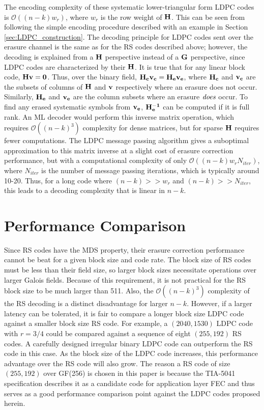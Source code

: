 \documentclass[conference]{IEEEtran}
\begin{document}
The encoding complexity of these systematic lower-triangular form LDPC codes is $\mathcal O((n-k)w_r)$, where $w_r$ is the row weight of $\bf{H}$.  This can be seen from following the simple encoding procedure described with an example in Section \ref{sec:LDPC_construction}.  The decoding principle for LDPC codes sent over the erasure channel is the same as for the RS codes described above; however, the decoding is explained from a $\bf{H}$ perspective instead of a $\bf{G}$ perspective, since LDPC codes are characterized by their $\bf{H}$.  It is true that for any linear block code, $\bf{H}\bf{v} = \bf{0}$.  Thus, over the binary field, $\bf{H}_c\bf{v}_c = \bf{H}_e\bf{v}_e$, where $\bf{H}_c$ and $\bf{v}_c$ are the subsets of columns of $\bf{H}$ and $\bf{v}$ respectively where an erasure does not occur.  Similarly, $\bf{H}_e$ and $\bf{v}_e$ are the column subsets where an erasure $\it{does}$ occur.  To find any erased systematic symbols from $\bf{v}_e$, $\bf{H}_e^{-1}$ can be computed if it is full rank.  An ML decoder would perform this inverse matrix operation, which requires $\mathcal O((n-k)^3)$ complexity for dense matrices, but for sparse $\bf{H}$ requires fewer computations.  The LDPC message passing algorithm gives a suboptimal approximation to this matrix inverse at a slight cost of erasure correction performance, but with a computational complexity of only $\mathcal O((n-k)w_rN_{iter})$, where $N_{iter}$ is the number of message passing iterations, which is typically around 10-20.  Thus, for a long code where $(n-k) >> w_r$ and $(n-k) >> N_{iter}$, this leads to a decoding complexity that is linear in $n-k$.

\section{Performance Comparison}\label{sec:Performance}
Since RS codes have the MDS property, their erasure correction performance cannot be beat for a given block size and code rate.  The block size of RS codes must be less than their field size, so larger block sizes necessitate operations over larger Galois fields.  Because of this requirement, it is not practical for the RS block size to be much larger than 511.  Also, the $\mathcal O((n-k)^3)$ complexity of the RS decoding is a distinct disadvantage for larger $n-k$.  However, if a larger latency can be tolerated, it is fair to compare a longer block size LDPC code against a smaller block size RS code.  For example, a $(2040, 1530)$ LDPC code with $r = {3}/{4}$ could be compared against a sequence of eight $(255, 192)$ RS codes.  A carefully designed irregular binary LDPC code can outperform the RS code in this case.  As the block size of the LDPC code increases, this performance advantage over the RS code will also grow.  The reason a RS code of size $(255, 192)$ over GF(256) is chosen in this paper is because the TIA-5041 specification \cite{TIA5041_standard} describes it as a candidate code for application layer FEC and thus serves as a good performance comparison point against the LDPC codes proposed herein.
\end{document}
